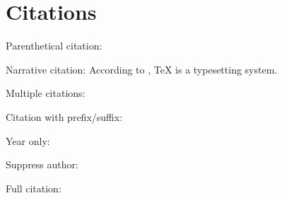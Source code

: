 \documentclass{article}
\begin{document}
\section{Citations}

Parenthetical citation: \parencite{knuth1984}

Narrative citation: According to \textcite{knuth1984}, TeX is a typesetting system.

Multiple citations: \parencite{knuth1984,lamport1994}

Citation with prefix/suffix: \parencite[see][p. 42]{knuth1984}

Year only: \cite*{knuth1984}

Suppress author: \parencite*{knuth1984}

Full citation: 

\printbibliography
\end{document}
